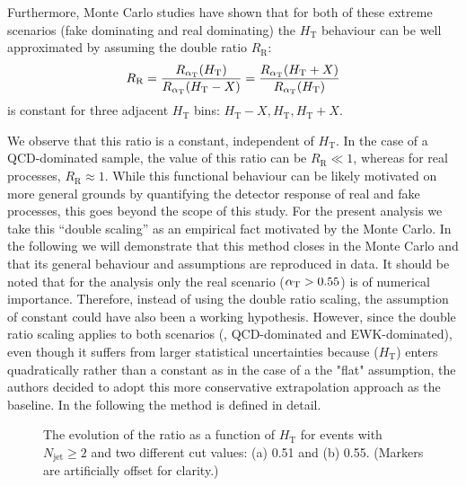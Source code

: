 Furthermore, Monte Carlo studies have shown that for both of these
extreme scenarios (fake \mymet dominating and real \mymet dominating)
the $H_{\mathrm{T}}$ behaviour can be well approximated by assuming
the double ratio $R_{\mathrm{R}}$:
\begin{equation}
  R_{\mathrm{R}} = 
  \frac{R_{\alpha_{\mathrm{T}}}(H_{\mathrm{T}})}{R_{\alpha_{\mathrm{T}}}(H_{\mathrm{T}}-X)} =
  \frac{R_{\alpha_{\mathrm{T}}}(H_{\mathrm{T}}+X)}{R_{\alpha_{\mathrm{T}}}(H_{\mathrm{T}})} 
\end{equation}
is constant for three adjacent $H_{\mathrm{T}}$ bins:
$H_{\mathrm{T}}-X, H_{\mathrm{T}}, H_{\mathrm{T}}+X$.

We observe that this ratio is a constant, independent of
$H_{\mathrm{T}}$. In the case of a QCD-dominated sample, the value of
this ratio can be $R_{\mathrm{R}} \ll 1$, whereas for real \mymet
processes, $R_{\mathrm{R}} \approx 1$. While this functional behaviour
can be likely motivated on more general grounds by quantifying the
detector response of real and fake \mymet processes, this goes beyond
the scope of this study.  For the present analysis we take this
``double scaling'' as an empirical fact motivated by the Monte
Carlo. In the following we will demonstrate that this method closes
in the Monte Carlo and that its general behaviour and assumptions are
reproduced in data.  It should be noted that for the analysis only the
real \mymet scenario ($\alpha_{\mathrm{T}} > 0.55$) is of numerical
importance. Therefore, instead of using the double ratio scaling, the
assumption of constant \RaT could have also been a working hypothesis.
However, since the double ratio scaling applies to both scenarios
(\ie, QCD-dominated and EWK-dominated), even though it suffers from
larger statistical uncertainties because \RaT($H_{\mathrm{T}}$) enters
quadratically rather than a constant as in the case of a the "flat"
assumption, the authors decided to adopt this more conservative
extrapolation approach as the baseline. In the following the method is
defined in detail.

\begin{figure}[!t]
  \begin{center} 
    \caption{\label{fig:ratio_vs_ht} The evolution of the ratio \RaT
      as a function of $H_{\mathrm{T}}$ for events with
      $N_{\mathrm{jet}}\geq2$ and two different \aT cut values: (a)
      0.51 and (b) 0.55. (Markers are artificially offset for
      clarity.)}
  \end{center}
\end{figure}

